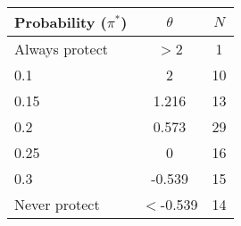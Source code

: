 \begin{table}[htbp]\centering

\begin{tabular}{l c c}
\hline\hline
Probability ($\pi^*$) &                $\theta$ & $N$\\
\hline
Always protect & $>$2 &   1 \\
0.1 & 2 & 10 \\
0.15 & 1.216 & 13 \\
0.2 & 0.573 & 29 \\
0.25 & 0 & 16 \\
0.3 & -0.539 & 15 \\
Never protect & $<$-0.539 &  14 \\
\hline
\end{tabular}
\end{table}
